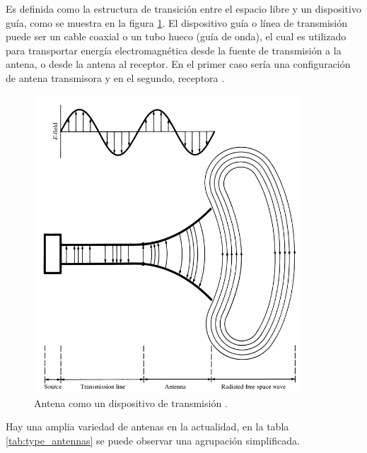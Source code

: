 Es definida como la estructura de transición entre el espacio libre y un dispositivo guía, como se muestra en la 
figura \ref{fig:antenna}. El dispositivo guía o línea de transmisión puede ser un cable coaxial o un tubo hueco (guía de 
onda), el cual es utilizado para transportar energía electromagnética desde la fuente de transmisión a la antena, o desde la 
antena al receptor. En el primer caso sería una configuración de antena transmisora y en el segundo, receptora \cite{Balanis2012}.
\begin{figure}[H]
 \centering
 \includegraphics[width=10cm]{gfx/antenna.png}
 \caption{Antena como un dispositivo de transmisión \cite{Balanis2012}.}
 \label{fig:antenna}
\end{figure}

Hay una amplia variedad de antenas en la actualidad, en la tabla \ref{tab:type_antennas} se puede observar una agrupación 
simplificada.

